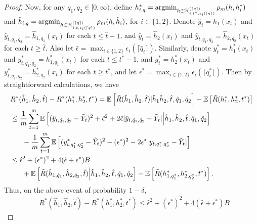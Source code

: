 \documentclass{article}
\begin{document}
\begin{proof}
Now, for any $q_{1},q_{2} \in [0,\infty)$, define 
$h_{i,q}^{*} = \mathop{\rm argmin}_{h \in \mathcal H_{i,t^{*},\epsilon_{i}( \lceil q \rceil)}^{(\lceil q \rceil)}} \rho_{m}(h,h_{i}^{*})$
and $\hat{h}_{i,q} = \mathop{\rm argmin}_{h \in \mathcal H_{i,\hat{t},\epsilon_{i}( \lceil q \rceil)}^{(\lceil q \rceil)}} \rho_{m}(h,\hat{h}_{i})$, for $i \in \{1,2\}$.
Denote $\hat{y}_{t} = \hat{h}_{1}(x_{t})$ and $\hat{y}_{t,q_{1},q_{2}} = \hat{h}_{1,q_{1}}(x_{t})$ for each $t \leq \hat{t}-1$,
and $\hat{y}_{t} = \hat{h}_{2}(x_{t})$ and $\hat{y}_{t,q_{1},q_{2}} = \hat{h}_{2,q_{2}}(x_{t})$ for each $t \geq \hat{t}$.
Also let $\hat{\epsilon} = \max_{i \in \{1,2\}} \epsilon_{i}( \lceil \hat{q}_{i} \rceil )$.
Similarly, denote 
$y_{t}^{*} = h_{1}^{*}(x_{t})$ and $y_{t,q_{1},q_{2}}^{*} = h_{1,q_{1}}^{*}(x_{t})$ for each $t \leq t^{*}-1$,
and $y_{t}^{*} = h_{2}^{*}(x_{t})$ and $y_{t,q_{1},q_{2}}^{*} = h_{2,q_{2}}^{*}(x_{t})$ for each $t \geq t^{*}$,
and let $\epsilon^{*} = \max_{i \in \{1,2\}} \epsilon_{i}( \lceil q_{i}^{*} \rceil )$.
Then by straightforward calculations, we have
\begin{align*}
& R^{*}(\hat{h}_{1},\hat{h}_{2},\hat{t}) - R^{*}(h_{1}^{*},h_{2}^{*},t^{*})
= \mathbb{E}\left[ \tilde{R}(\hat{h}_{1},\hat{h}_{2},\hat{t}) | \hat{h}_{1} \hat{h}_{2}, \hat{t}, \hat{q}_{1}, \hat{q}_{2} \right] - \mathbb{E}\left[ \tilde{R}(h_{1}^{*},h_{2}^{*},t^{*}) \right]
\\ & \leq \frac{1}{m}\sum_{t=1}^{m} \mathbb{E}\left[ (\hat{y}_{t,\hat{q}_{1},\hat{q}_{2}} - \tilde{Y}_{t})^{2} + \hat{\epsilon}^{2} + 2 \hat{\epsilon} | \hat{y}_{t,\hat{q}_{1},\hat{q}_{2}} - \tilde{Y}_{t} | \middle| \hat{h}_{1},\hat{h}_{2},\hat{t},\hat{q}_{1},\hat{q}_{2} \right]
\\ & {\hskip 6mm}- \frac{1}{m} \sum_{t=1}^{m} \mathbb{E}\left[ (y_{t,q_{1}^{*},q_{2}^{*}}^{*} - \tilde{Y}_{t})^{2} - (\epsilon^{*})^{2} - 2 \epsilon^{*} | y_{t,q_{1}^{*},q_{2}^{*}} - \tilde{Y}_{t} | \right]
\\ & \leq \hat{\epsilon}^{2} + (\epsilon^{*})^{2} + 4 ( \hat{\epsilon} + \epsilon^{*} ) B 
\\ & {\hskip 6mm}+ \mathbb{E}\left[ \tilde{R}(\hat{h}_{1,\hat{q}_{1}},\hat{h}_{2,\hat{q}_{2}},\hat{t}) \middle| \hat{h}_{1}, \hat{h}_{2}, \hat{t}, \hat{q}_{1}, \hat{q}_{2} \right] - \mathbb{E}\left[ \tilde{R}(h_{1,q_{1}^{*}}^{*}, h_{2,q_{2}^{*}}^{*}, t^{*}) \right].
\end{align*}
Thus, on the above event of probability $1-\delta$, 
\begin{align*}
& R^{*}(\hat{h}_{1},\hat{h}_{2},\hat{t}) - R^{*}(h_{1}^{*},h_{2}^{*},t^{*})
\leq \hat{\epsilon}^{2} + (\epsilon^{*})^{2} + 4 ( \hat{\epsilon} + \epsilon^{*} ) B 

\end{align*}
\end{proof}
\end{document}
